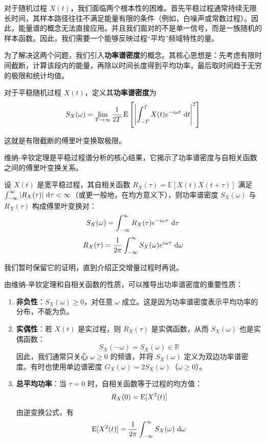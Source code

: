 对于随机过程 \(X(t)\)，我们面临两个根本性的困难。首先平稳过程通常持续无限长时间，其样本路径往往不满足能量有限的条件（例如，白噪声或常数过程）。因此，能量谱的概念无法直接应用。并且我们面对的不是单一信号，而是一族随机的样本函数。因此，我们需要一个能够反映过程“平均”频域特性的量。

为了解决这两个问题，我们引入\textbf{功率谱密度}的概念。其核心思想是：先考虑有限时间截断，计算该段内的能量，再除以时间长度得到平均功率，最后取时间趋于无穷的极限和统计均值。

对于平稳随机过程 \(X(t)\)，定义其\textbf{功率谱密度}为
\[
S_X(\omega) = \lim_{T \to \infty} \frac{1}{2T} \operatorname{E}\left[ \left| \int_{-T}^{T} X(t) e^{-i\omega t} \, \mathop{}\!\mathrm{d} t \right|^2 \right]
\]

这就是有限截断的傅里叶变换取极限。

维纳-辛钦定理是平稳过程谱分析的核心结果，它揭示了功率谱密度与自相关函数之间的傅里叶变换关系。

\begin{theorem}[维纳-辛钦定理]
设 \(X(t)\) 是宽平稳过程，其自相关函数 \(R_X(\tau) = \mathbb{E}[X(t)X(t+\tau)]\) 满足 \(\int_{-\infty}^{\infty} |R_X(\tau)| \, \mathop{}\!\mathrm{d} \tau < \infty\)（或更一般地，在均方意义下），则功率谱密度 \(S_X(\omega)\) 与 \(R_X(\tau)\) 构成傅里叶变换对：
\[
S_X(\omega) = \int_{-\infty}^{\infty} R_X(\tau) e^{-i\omega\tau} \, \mathop{}\!\mathrm{d} \tau
\]
\[
R_X(\tau) = \frac{1}{2\pi} \int_{-\infty}^{\infty} S_X(\omega) e^{i\omega\tau} \, \mathop{}\!\mathrm{d} \omega
\]
\end{theorem}

我们暂时保留它的证明，直到介绍正交增量过程时再说。

由维纳-辛钦定理和自相关函数的性质，可以推导出功率谱密度的重要性质：

\begin{enumerate}
    \item \textbf{非负性}：\(S_X(\omega) \ge 0\)，对任意 \(\omega\) 成立。这是因为功率谱密度表示平均功率的分布，不能为负。
    
    \item \textbf{实偶性}：若 \(X(t)\) 是实过程，则 \(R_X(\tau)\) 是实偶函数，从而 \(S_X(\omega)\) 也是实偶函数：
    \[
    S_X(-\omega) = S_X(\omega) \in \mathbb{R}
    \]
    因此，我们通常只关心 \(\omega \ge 0\) 的频谱，并将 \(S_X(\omega)\) 定义为双边功率谱密度。有时也使用单边谱密度 \(G_X(\omega) = 2S_X(\omega)\)（\(\omega \ge 0\)）。
    
    \item \textbf{总平均功率}：当 \(\tau = 0\) 时，自相关函数等于过程的均方值：
    \[
    R_X(0) = \operatorname{E}[X^2(t)]
    \]
    由逆变换公式，有
    \[
    \operatorname{E}[X^2(t)] = \frac{1}{2\pi} \int_{-\infty}^{\infty} S_X(\omega) \, \mathop{}\!\mathrm{d} \omega
    \]
\end{enumerate}

